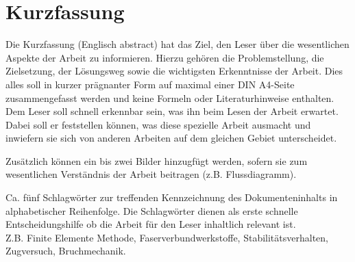 \chapter*{Kurzfassung} 
Die Kurzfassung (Englisch abstract) hat das Ziel, den Leser über die wesentlichen Aspekte der Arbeit zu informieren. Hierzu gehören die Problemstellung, die Zielsetzung, der Lösungsweg sowie die wichtigsten Erkenntnisse der Arbeit. Dies alles soll in kurzer prägnanter Form auf maximal einer DIN A4-Seite zusammengefasst werden und keine Formeln oder Literaturhinweise enthalten. Dem Leser soll schnell erkennbar sein, was ihn beim Lesen der Arbeit erwartet. Dabei soll er feststellen können, was diese spezielle Arbeit ausmacht und inwiefern sie sich von anderen Arbeiten auf dem gleichen Gebiet unterscheidet.

Zusätzlich können ein bis zwei Bilder hinzugfügt werden, sofern sie zum wesentlichen Verständnis der Arbeit beitragen (z.B. Flussdiagramm). 

\begin{keywords}
Ca. fünf Schlagwörter zur treffenden Kennzeichnung des Dokumenteninhalts in alphabetischer Reihenfolge. Die Schlagwörter dienen als erste schnelle Entscheidungshilfe ob die Arbeit für den Leser inhaltlich relevant ist.\\
Z.B. Finite Elemente Methode, Faserverbundwerkstoffe, Stabilitätsverhalten, Zugversuch, Bruchmechanik.
\end{keywords}